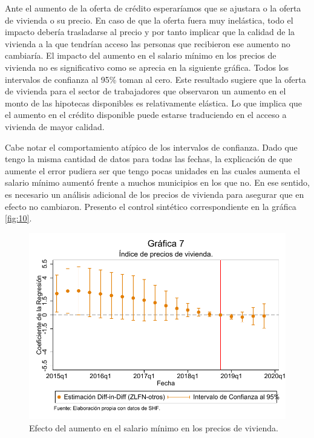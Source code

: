 Ante el aumento de la oferta de crédito esperaríamos que se ajustara o la oferta de vivienda o su precio. En caso de que la oferta fuera muy inelástica, todo el impacto debería trasladarse al precio y por tanto implicar que la calidad de la vivienda a la que tendrían acceso las personas que recibieron ese aumento no cambiaría. El impacto del aumento en el salario mínimo en los precios de vivienda no es significativo como se aprecia en la siguiente gráfica. Todos los intervalos de confianza al 95\% toman al cero. Este resultado sugiere que la oferta de vivienda para el sector de trabajadores que observaron un aumento en el monto de las hipotecas disponibles es relativamente elástica. Lo que implica que el aumento en el crédito disponible puede estarse traduciendo en el acceso a vivienda de mayor calidad. 

Cabe notar el comportamiento atípico de los intervalos de confianza. Dado que tengo la misma cantidad de datos para todas las fechas, la explicación de que aumente el error pudiera ser que tengo pocas unidades en las cuales aumenta el salario mínimo aumentó frente a muchos municipios en los que no. En ese sentido, es necesario un análisis adicional de los precios de vivienda para asegurar que en efecto no cambiaron. Presento el control sintético correspondiente en la gráfica \ref{fig:10}.

\begin{figure}[H]
\includegraphics[width=\textwidth]{Figures/Precios_Muestracompleta.pdf}
\caption{Efecto del aumento en el salario mínimo en los precios de vivienda.}
\label{fig:7}
\end{figure}

